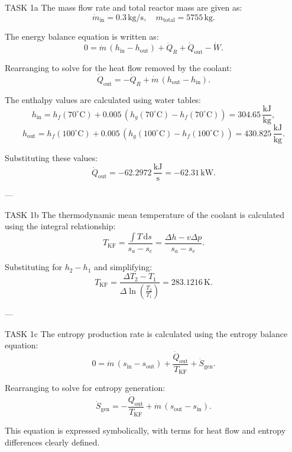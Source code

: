 TASK 1a  
The mass flow rate and total reactor mass are given as:  
\[
\dot{m}_{\text{in}} = 0.3 \, \text{kg/s}, \quad m_{\text{total}} = 5755 \, \text{kg}.
\]  

The energy balance equation is written as:  
\[
0 = \dot{m} \, (h_{\text{in}} - h_{\text{out}}) + \dot{Q}_R + \dot{Q}_{\text{out}} - \dot{W}.
\]  

Rearranging to solve for the heat flow removed by the coolant:  
\[
\dot{Q}_{\text{out}} = -\dot{Q}_R + \dot{m} \, (h_{\text{out}} - h_{\text{in}}).
\]  

The enthalpy values are calculated using water tables:  
\[
h_{\text{in}} = h_f(70^\circ\text{C}) + 0.005 \, (h_g(70^\circ\text{C}) - h_f(70^\circ\text{C})) = 304.65 \, \frac{\text{kJ}}{\text{kg}},
\]  
\[
h_{\text{out}} = h_f(100^\circ\text{C}) + 0.005 \, (h_g(100^\circ\text{C}) - h_f(100^\circ\text{C})) = 430.825 \, \frac{\text{kJ}}{\text{kg}}.
\]  

Substituting these values:  
\[
\dot{Q}_{\text{out}} = -62.2972 \, \frac{\text{kJ}}{\text{s}} = -62.31 \, \text{kW}.
\]  

---

TASK 1b  
The thermodynamic mean temperature of the coolant is calculated using the integral relationship:  
\[
T_{\text{KF}} = \frac{\int T \, \text{d}s}{s_a - s_e} = \frac{\Delta h - v \Delta p}{s_a - s_e}.
\]  

Substituting for \( h_2 - h_1 \) and simplifying:  
\[
T_{\text{KF}} = \frac{\Delta T_2 - T_1}{\Delta \ln \left( \frac{T_2}{T_1} \right)} = 283.1216 \, \text{K}.
\]  

---

TASK 1c  
The entropy production rate is calculated using the entropy balance equation:  
\[
0 = \dot{m} \, (s_{\text{in}} - s_{\text{out}}) + \frac{\dot{Q}_{\text{out}}}{T_{\text{KF}}} + \dot{S}_{\text{gen}}.
\]  

Rearranging to solve for entropy generation:  
\[
\dot{S}_{\text{gen}} = -\frac{\dot{Q}_{\text{out}}}{T_{\text{KF}}} + \dot{m} \, (s_{\text{out}} - s_{\text{in}}).
\]  

This equation is expressed symbolically, with terms for heat flow and entropy differences clearly defined.